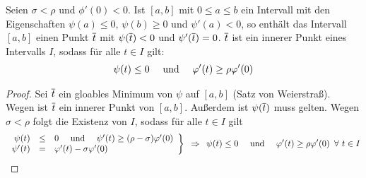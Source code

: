 \begin{lemma}
	Seien $\sigma < \rho$ und $\phi'(0) < 0$. Ist $[a,b]$ mit $0 \le a \le b$ ein Intervall mit den Eigenschaften $\psi(a) \le 0$, $\psi(b) \ge 0$ und $\psi'(a) < 0$, so enthält das Intervall $[a,b]$ einen Punkt $\overline{t}$ mit $\psi(\overline{t}) < 0$ und $\psi'(\overline{t}) = 0$. $\overline{t}$ ist ein innerer Punkt eines Intervalls $I$, sodass für alle $t \in I$ gilt:
	\begin{align}
		\psi(t) \le 0 \quad \text{ und } \quad \varphi'(t) \ge \rho \varphi'(0) \label{eq: 9_lemma}
	\end{align}
\end{lemma}
\begin{proof}
	Sei $\overline{t}$ ein gloables Minimum von $\psi$ auf $[a,b]$ (Satz von Weierstraß). Wegen  ist $\overline{t}$ ein innerer Punkt von $[a,b]$. Außerdem ist $\psi(\overline{t})$ muss gelten. 
	Wegen $\sigma < \rho$ folgt die Existenz von $I$, sodass für alle $t \in I$ gilt
	\begin{align*}
		\left.\begin{array}{rcl}
		\psi(t) &\le & 0 \quad \text{ und } \quad \psi'(t) \ge (\rho - \sigma) \varphi'(0) \\
		\psi'(t) &= & \varphi'(t) - \sigma \varphi'(0)
		\end{array}
		\right\} \enskip \Rightarrow \enskip \psi(t) \le 0 \quad \text{ und } \quad \varphi'(t) \ge \rho \varphi'(0) \enskip \forall \ t \in I
	\end{align*}
\end{proof}


